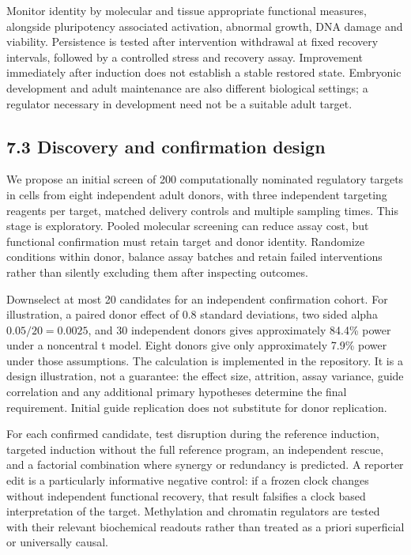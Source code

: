 \documentclass[
  11pt,
  letterpaper,
]{article}
\begin{document}
Monitor identity by molecular and tissue appropriate functional
measures, alongside pluripotency associated activation, abnormal growth,
DNA damage and viability. Persistence is tested after intervention
withdrawal at fixed recovery intervals, followed by a controlled stress
and recovery assay. Improvement immediately after induction does not
establish a stable restored state. Embryonic development and adult
maintenance are also different biological settings; a regulator
necessary in development need not be a suitable adult target.

\hypertarget{discovery-and-confirmation-design}{%
\subsection{7.3 Discovery and confirmation
design}\label{discovery-and-confirmation-design}}

We propose an initial screen of 200 computationally nominated regulatory
targets in cells from eight independent adult donors, with three
independent targeting reagents per target, matched delivery controls and
multiple sampling times. This stage is exploratory. Pooled molecular
screening can reduce assay cost, but functional confirmation must retain
target and donor identity. Randomize conditions within donor, balance
assay batches and retain failed interventions rather than silently
excluding them after inspecting outcomes.

Downselect at most 20 candidates for an independent confirmation cohort.
For illustration, a paired donor effect of 0.8 standard deviations, two
sided alpha \(0.05/20=0.0025\), and 30 independent donors gives
approximately 84.4\% power under a noncentral t model. Eight donors give
only approximately 7.9\% power under those assumptions. The calculation
is implemented in the repository. It is a design illustration, not a
guarantee: the effect size, attrition, assay variance, guide correlation
and any additional primary hypotheses determine the final requirement.
Initial guide replication does not substitute for donor replication.

For each confirmed candidate, test disruption during the reference
induction, targeted induction without the full reference program, an
independent rescue, and a factorial combination where synergy or
redundancy is predicted. A reporter edit is a particularly informative
negative control: if a frozen clock changes without independent
functional recovery, that result falsifies a clock based interpretation
of the target. Methylation and chromatin regulators are tested with
their relevant biochemical readouts rather than treated as a priori
superficial or universally causal.
\end{document}
